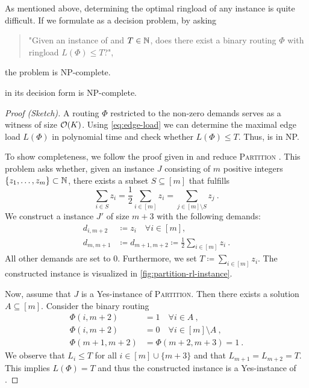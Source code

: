 As mentioned above, determining the optimal ringload of any \RL instance is quite difficult.
If we formulate \RL as a decision problem, by asking
\begin{quote}
	"Given an instance of \RL and $T \in \mathbb{N}$, does there exist a binary routing $\Phi$ with ringload $L(\Phi) \leq T$?",
\end{quote}
the problem is NP-complete.
\begin{theorem}
	\RL in its decision form is NP-complete.
\end{theorem}
\begin{proof}[Proof (Sketch)]
	A routing $\Phi$ restricted to the non-zero demands serves as a witness of size $\mathcal{O}(K)$.
	Using \cref{eq:edge-load} we can determine the maximal edge load $L(\Phi)$ in polynomial time and check whether $L(\Phi) \leq T$.
	Thus, \RL is in NP.
	
	To show completeness, we follow the proof given in \cite{schrijver99} and reduce \textsc{Partition} \cite{karp72}.
	This problem asks whether, given an instance $J$ consisting of $m$ positive integers $\{z_1, \ldots, z_m\} \subset \mathbb{N}$, there exists a subset $S \subseteq [m]$ that fulfills
	\begin{equation}
		\sum_{i \in S} z_i = \frac{1}{2}  \sum_{i \in [m]} z_i = \sum_{j \in [m] \setminus S} z_j\ .
	\end{equation}
	We construct a \RL instance $J'$ of size $m + 3$ with the following demands:
	\begin{align}
			d_{i, m+2} &\coloneqq z_i \quad \forall i \in [m], \\
			d_{m, m+1} &\coloneqq d_{m+1, m+2} \coloneqq \frac{1}{2}  \sum_{i \in [m]} z_i \ . 
	\end{align}
	All other demands are set to $0$.
	Furthermore, we set $T \coloneqq \sum_{i \in [m]} z_i$.
	The constructed instance is visualized in \cref{fig:partition-rl-instance}.
	
	Now, assume that $J$ is a Yes-instance of \textsc{Partition}.
	Then there exists a solution $A \subseteq [m]$.
	Consider the binary routing
	\begin{align}
		\Phi(i, m+2) &= 1 \quad \forall i \in A \ , \\
		\Phi(i, m+2) &= 0 \quad \forall i \in [m] \setminus A \ ,	 \\
		\Phi(m+1, m+2) & = \Phi(m+2, m+3) = 1 \ .
	\end{align}
	We observe that $L_i \leq T$ for all $i \in [m] \cup \{m+3\}$ and that $L_{m+1} = L_{m+2} = T$.
	This implies $L(\Phi) = T$ and thus the constructed instance is a Yes-instance of \RL.
	

\end{proof}
